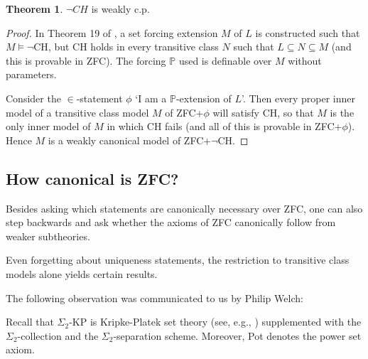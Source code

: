 \documentclass[a4paper,12pt]{amsart}
\theoremstyle{definition}
\newtheorem{thm}[fact]{Theorem}
\begin{document}
\begin{thm}{\label{nonCHweaklynecessary}}
$\neg CH$ is weakly c.p.
\end{thm}
\begin{proof}
In Theorem 19 of \cite{G}, a set forcing extension $M$ of $L$ is constructed such that $M\models\neg\text{CH}$, but
CH holds in every transitive class $N$ such that $L\subseteq N\subseteq M$ (and this is provable in ZFC). The forcing $\mathbb{P}$ used is definable over $M$ without parameters.

Consider the $\in$-statement $\phi$ `I am a $\mathbb{P}$-extension of $L$'. Then every proper inner model of a transitive class model $M$ of ZFC+$\phi$ will satisfy CH, so that
$M$ is the only inner model of $M$ in which CH fails (and all of this is provable in ZFC+$\phi$). Hence $M$ is a weakly canonical model of ZFC+$\neg$CH.
 
\end{proof}




\subsection{How canonical is ZFC?}


Besides asking which statements are canonically necessary over ZFC, one can also step backwards and ask whether the axioms of ZFC canonically follow from weaker subtheories. 

Even forgetting about uniqueness statements, the restriction to transitive class models alone yields certain results. 

The following observation was communicated to us by Philip Welch: 



Recall that $\Sigma_2$-KP is Kripke-Platek set theory (see, e.g., \cite{MW}) supplemented with the $\Sigma_2$-collection and the $\Sigma_2$-separation scheme.
Moreover, Pot denotes the power set axiom. 
\end{document}
